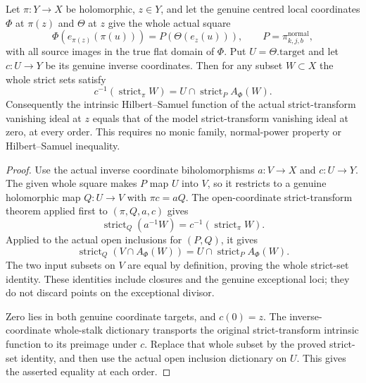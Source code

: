 \begin{theorem}
\label{hir:actual-fixed-flattening-strict-set-hs-equality}
\leanok
Let $\pi:Y\to X$ be holomorphic, $z\in Y$, and let the genuine
centred local coordinates $\Phi$ at $\pi(z)$ and $\Theta$ at
$z$ give the whole actual square
\[
 \Phi(e_{\pi(z)}(\pi(u)))=
 P(\Theta(e_z(u))),\qquad
 P=\pi^{\mathrm{normal}}_{k,j,b},
\]
with all source images in the true flat domain of $\Phi$.
Put $U=\Theta.\mathrm{target}$ and let $c:U\to Y$ be its
genuine inverse coordinates. Then for any subset $W\subset X$
the whole strict sets satisfy
\[
 c^{-1}(\operatorname{strict}_\pi W)
 =U\cap\operatorname{strict}_P A_\Phi(W).
\]
Consequently the intrinsic Hilbert--Samuel function of the
actual strict-transform vanishing ideal at $z$ equals that
of the model strict-transform vanishing ideal at zero, at
every order. This requires no monic family, normal-power
property or Hilbert--Samuel inequality.
\end{theorem}
\begin{proof}
Use the actual inverse coordinate biholomorphisms
$a:V\to X$ and $c:U\to Y$. The given whole square makes
$P$ map $U$ into $V$, so it restricts to a genuine
holomorphic map $Q:U\to V$ with $\pi c=aQ$.
The open-coordinate strict-transform theorem applied first
to $(\pi,Q,a,c)$ gives
\[
 \operatorname{strict}_Q(a^{-1}W)
 =c^{-1}(\operatorname{strict}_\pi W).
\]
Applied to the actual open inclusions for $(P,Q)$, it gives
\[
 \operatorname{strict}_Q(V\cap A_\Phi(W))
 =U\cap\operatorname{strict}_P A_\Phi(W).
\]
The two input subsets on $V$ are equal by definition, proving
the whole strict-set identity. These identities include
closures and the genuine exceptional loci; they do not
discard points on the exceptional divisor.

Zero lies in both genuine coordinate targets, and $c(0)=z$.
The inverse-coordinate whole-stalk dictionary transports
the original strict-transform intrinsic function to its
preimage under $c$. Replace that whole subset by the
proved strict-set identity, and then use the actual open
inclusion dictionary on $U$. This gives the asserted
equality at each order.
\end{proof}

